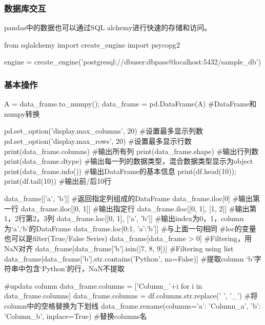     \subsubsection{数据库交互}
      pandas中的数据也可以通过SQL alchemy进行快速的存储和访问。
      \begin{codeblock}[language=python, caption={pandas \& database}]
        from sqlalchemy import create_engine
        import psycopg2

        engine = create_engine('postgresql://dbuser:dbpass@localhost:5432/sample_db')
      \end{codeblock}

    \subsubsection{基本操作}
      \begin{codeblock}[language=python, caption={Basic functions about DataFrame}]
        A = data_frame.to_numpy(); data_frame = pd.DataFrame(A) #DataFrame和numpy转换

        pd.set_option('display.max_columns', 20) #设置最多显示列数
        pd.set_option('display.max_rows', 20) #设置最多显示行数
        print(data_frame.columns) #输出所有列
        print(data_frame.shape) #输出行列数
        print(data_frame.dtype) #输出每一列的数据类型，混合数据类型显示为object
        print(data_frame.info()) #输出DataFrame的基本信息
        print(df.head(10)); print(df.tail(10)) #输出前/后10行

        data_frame[['a', 'b']] #返回指定列组成的DataFrame
        data_frame.iloc[0] #输出第一行
        data_frame.iloc[[0, 1]] #输出指定行
        data_frame.iloc[[0, 1], [1, 2]] #输出第1，2行第2，3列
        data_frame.loc[[0, 1], ['a', 'b']] #输出index为0，1，column为`a',`b'的DataFrame
        data_frame.loc[0:1, 'a':'b']] #与上面一句相同
            #loc的变量也可以是filter(True/False Series)
        data_frame[data_frame > 0] #Filtering，用NaN对齐
        data_frame[data_frame['b'].isin([7, 8, 9])] #Filtering using list
        data_frame[data_frame['b'].str.contains('Python', na=False)] 
            #提取column `b'字符串中包含`Python'的行，NaN不提取

        #updata column
        data_frame.columns = ['Column_'+i for i in data_frame.columns]
        data_frame.columns = df.columns.str.replace(' ', '_') #将column中的空格替换为下划线
        data_frame.rename(columns={'a': 'Column_a', 'b': 'Column_b'}, inplace=True) 
            #替换columns名


\end{codeblock}
